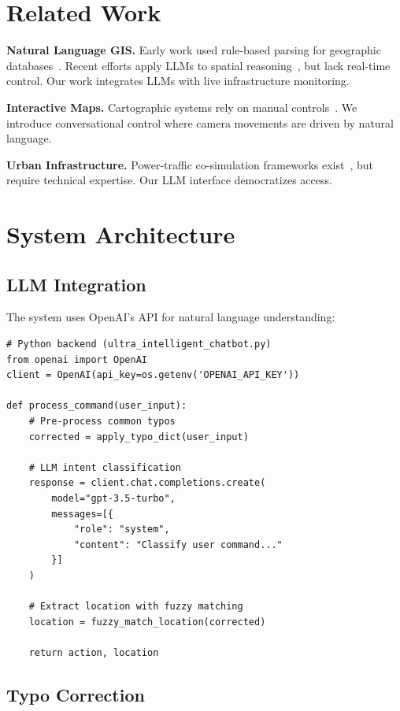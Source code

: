 \documentclass[sigconf]{acmart}
\begin{document}
\section{Related Work}

\textbf{Natural Language GIS.} Early work used rule-based parsing for geographic databases~\cite{popescu2003natural}. Recent efforts apply LLMs to spatial reasoning~\cite{roberts2023gpt,liu2023llm}, but lack real-time control. Our work integrates LLMs with live infrastructure monitoring.

\textbf{Interactive Maps.} Cartographic systems rely on manual controls~\cite{roth2017cartographic}. We introduce conversational control where camera movements are driven by natural language.

\textbf{Urban Infrastructure.} Power-traffic co-simulation frameworks exist~\cite{pypsa2018,lopez2018}, but require technical expertise. Our LLM interface democratizes access.

\section{System Architecture}

\subsection{LLM Integration}

The system uses OpenAI's API for natural language understanding:

\begin{verbatim}
# Python backend (ultra_intelligent_chatbot.py)
from openai import OpenAI
client = OpenAI(api_key=os.getenv('OPENAI_API_KEY'))

def process_command(user_input):
    # Pre-process common typos
    corrected = apply_typo_dict(user_input)

    # LLM intent classification
    response = client.chat.completions.create(
        model="gpt-3.5-turbo",
        messages=[{
            "role": "system",
            "content": "Classify user command..."
        }]
    )

    # Extract location with fuzzy matching
    location = fuzzy_match_location(corrected)

    return action, location
\end{verbatim}

\subsection{Typo Correction}
\end{document}
